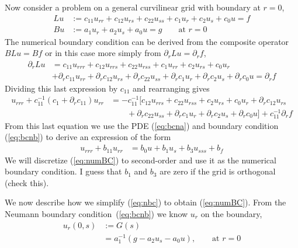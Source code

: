 Now consider a problem on a general curvilinear grid with boundary at $r=0$, 
\begin{align}
   L u &:= c_{11} u_{rr} + c_{12} u_{rs} + c_{22} u_{ss} + c_1 u_r + c_2 u_s + c_0 u = f \label{eq:bcna}\\
   B u &:= a_1 u_r + a_2 u_s + a_0 u = g \qquad \mbox{at $r=0$} \label{eq:bcnb}
\end{align}
The numerical boundary condition can be derived from the composite operator $BL u = Bf$
or in this case more simply from $\partial_r L u = \partial_r f$,
\begin{align}
\partial_r L u &= c_{11} u_{rrr} + c_{12} u_{rrs} + c_{22} u_{rss} + c_1 u_{rr} + c_2 u_{rs} + c_0 u_r \\
               &+ \partial_r c_{11} u_{rr} + \partial_r c_{12} u_{rs} + \partial_r c_{22} u_{ss} + 
                  \partial_r c_1 u_r + \partial_r c_2 u_s + \partial_r c_0 u  = \partial_r f
\end{align}
Dividing this last expression by $c_{11}$ and rearranging gives 
\begin{align}
  u_{rrr} + c_{11}^{-1}(c_1+ \partial_r c_{11}) u_{rr}
                & = - c_{11}^{-1}\Big[ c_{12} u_{rrs} + c_{22} u_{rss}  + c_2 u_{rs} + c_0 u_r 
                              + \partial_r c_{12} u_{rs}\\
          &\qquad  + \partial_r c_{22} u_{ss} + \partial_r c_1 u_r + \partial_r c_2 u_s + \partial_r c_0 u\Big]
                      +c_{11}^{-1}\partial_r f  \label{eq:nbc}
\end{align}
From this last equation we use the PDE (\ref{eq:bcna}) and boundary condition (\ref{eq:bcnb})
to derive an expression of the form
\begin{align}
 u_{rrr} + b_{11} u_{rr} &= b_0 u + b_1 u_s + b_3 u_{sss} + b_f \label{eq:numBC}
\end{align}
We will discretize (\ref{eq:numBC}) to second-order and use it as the numerical boundary condition.
I guess that $b_1$ and $b_3$ are zero if the grid is orthogonal (check this).

We now describe how we simplify (\ref{eq:nbc}) to obtain (\ref{eq:numBC}).
From the Neumann boundary condition~(\ref{eq:bcnb}) we know $u_r$ on the boundary,
\begin{align}
    u_r(0,s) & := G(s) \\
             & =   a_1^{-1} ( g - a_2 u_s - a_0 u ),  \qquad \mbox{at $r=0$} \\
\end{align}


